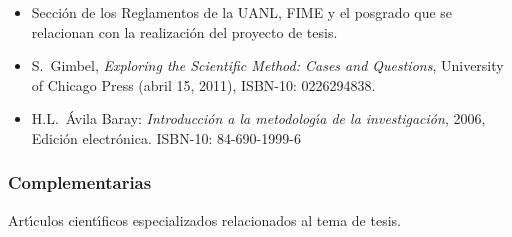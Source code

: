 \documentclass[10 pt]{article}
\begin{document}
 \begin{itemize}[itemsep=0em]

   \item{Secci\'{o}n de los Reglamentos de la UANL, FIME y el posgrado que se relacionan con la realizaci\'{o}n del proyecto de tesis.}

    \item{S.\ {\sc Gimbel}, {\em Exploring the Scientific Method:
          Cases and Questions}, University of Chicago Press (abril 15,
        2011), ISBN-10: 0226294838.}

      \item{ H.L.\ {\sc \'{A}vila Baray}: {\em Introducci\'{o}n a la
            metodolog\'{\i}a de la investigaci\'{o}n}, 2006, Edici\'{o}n electr\'{o}nica. ISBN-10: 84-690-1999-6}
   
\end{itemize}

\subsubsection{Complementarias}

Art\'{\i}culos cient\'{\i}ficos especializados relacionados al tema de tesis.

\label{final} %


\end{document}
